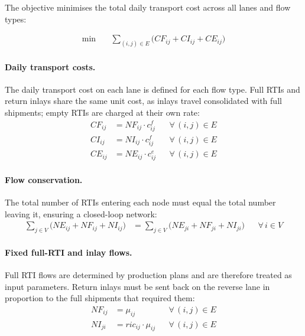 The objective minimises the total daily transport cost across all lanes and
flow types:

%
\begin{align}
  \min \quad & \sum_{(i,j)\in E}
    \bigl(CF_{ij} + CI_{ij} + CE_{ij}\bigr)
  \label{eq:objective}
\end{align}

\paragraph{Daily transport costs.}
The daily transport cost on each lane is defined for each flow type. Full RTIs
and return inlays share the same unit cost, as inlays travel consolidated with
full shipments; empty RTIs are charged at their own rate:
%
\begin{align}
  CF_{ij} &= NF_{ij}\cdot c^{f}_{ij}
    && \forall\,(i,j)\in E
    \label{eq:cost-full}\\
  CI_{ij} &= NI_{ij}\cdot c^{f}_{ij}
    && \forall\,(i,j)\in E
    \label{eq:cost-inlay}\\
  CE_{ij} &= NE_{ij}\cdot c^{e}_{ij}
    && \forall\,(i,j)\in E
    \label{eq:cost-empty}
\end{align}

\paragraph{Flow conservation.}
The total number of RTIs entering each node must equal the total number leaving
it, ensuring a closed-loop network:
%
\begin{align}
  \sum_{j \in V}\!\bigl(NE_{ij}+NF_{ij}+NI_{ij}\bigr)
  &= \sum_{j \in V}\!\bigl(NE_{ji}+NF_{ji}+NI_{ji}\bigr)
  && \forall\, i \in V
  \label{eq:flow-conservation}
\end{align}

\paragraph{Fixed full-RTI and inlay flows.}
Full RTI flows are determined by production plans and are therefore treated as
input parameters. Return inlays must be sent back on the reverse lane in
proportion to the full shipments that required them:
%
\begin{align}
  NF_{ij} &= \mu_{ij}
    && \forall\,(i,j) \in E
    \label{eq:full-flow-fixed} \\
  NI_{ji} &= ric_{ij}\cdot\mu_{ij}
    && \forall\,(i,j) \in E
    \label{eq:inlay-flow-fixed}
\end{align}

